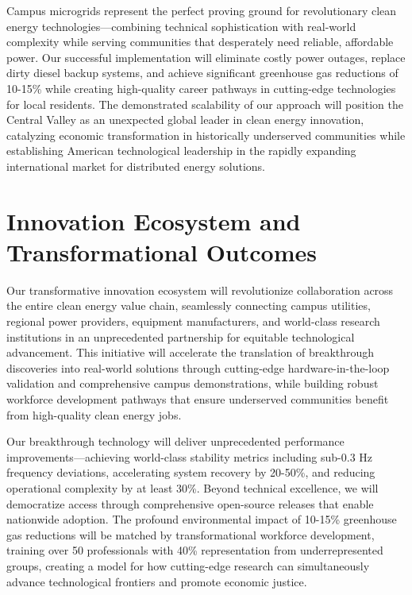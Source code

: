\documentclass[12pt]{article}
\begin{document}
Campus microgrids represent the perfect proving ground for revolutionary clean energy technologies—combining technical sophistication with real-world complexity while serving communities that desperately need reliable, affordable power. Our successful implementation will eliminate costly power outages, replace dirty diesel backup systems, and achieve significant greenhouse gas reductions of 10-15\% while creating high-quality career pathways in cutting-edge technologies for local residents. The demonstrated scalability of our approach will position the Central Valley as an unexpected global leader in clean energy innovation, catalyzing economic transformation in historically underserved communities while establishing American technological leadership in the rapidly expanding international market for distributed energy solutions.

\section{Innovation Ecosystem and Transformational Outcomes}

Our transformative innovation ecosystem will revolutionize collaboration across the entire clean energy value chain, seamlessly connecting campus utilities, regional power providers, equipment manufacturers, and world-class research institutions in an unprecedented partnership for equitable technological advancement. This initiative will accelerate the translation of breakthrough discoveries into real-world solutions through cutting-edge hardware-in-the-loop validation and comprehensive campus demonstrations, while building robust workforce development pathways that ensure underserved communities benefit from high-quality clean energy jobs.

Our breakthrough technology will deliver unprecedented performance improvements—achieving world-class stability metrics including sub-0.3 Hz frequency deviations, accelerating system recovery by 20-50\%, and reducing operational complexity by at least 30\%. Beyond technical excellence, we will democratize access through comprehensive open-source releases that enable nationwide adoption. The profound environmental impact of 10-15\% greenhouse gas reductions will be matched by transformational workforce development, training over 50 professionals with 40\% representation from underrepresented groups, creating a model for how cutting-edge research can simultaneously advance technological frontiers and promote economic justice.
\end{document}
